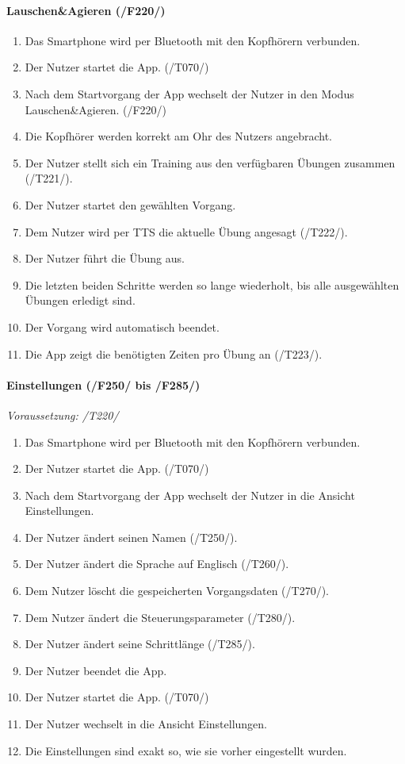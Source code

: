 \documentclass[a4paper,12pt]{article}
\begin{document}
      \paragraph{Lauschen\&Agieren (/F220/)}
      \begin{enumerate}
        \item Das Smartphone wird per Bluetooth mit den Kopfhörern verbunden.
        \item Der Nutzer startet die App. (/T070/)
        \item Nach dem Startvorgang der App wechselt der Nutzer in den Modus \glqq Lauschen\&Agieren\grqq . (/F220/)
        \item Die Kopfhörer werden korrekt am Ohr des Nutzers angebracht.
        \item Der Nutzer stellt sich ein Training aus den verfügbaren Übungen zusammen (/T221/).
        \item Der Nutzer startet den gewählten \Gls{Vorgang}.
        \item Dem Nutzer wird per \Gls{TTS} die aktuelle Übung angesagt (/T222/).
        \item Der Nutzer führt die Übung aus.
        \item Die letzten beiden Schritte werden so lange wiederholt, bis alle ausgewählten Übungen erledigt sind.
        \item Der \Gls{Vorgang} wird automatisch beendet.
        \item Die App zeigt die benötigten Zeiten pro Übung an (/T223/).
      \end{enumerate}

      \paragraph{Einstellungen (/F250/ bis /F285/)}
      \textit{Voraussetzung: /T220/}
      \begin{enumerate}
        \item Das Smartphone wird per Bluetooth mit den Kopfhörern verbunden.
        \item Der Nutzer startet die App. (/T070/)
        \item Nach dem Startvorgang der App wechselt der Nutzer in die Ansicht \glqq Einstellungen\grqq .
        \item Der Nutzer ändert seinen Namen (/T250/).
        \item Der Nutzer ändert die Sprache auf Englisch (/T260/).
        \item Dem Nutzer löscht die gespeicherten \Gls{Vorgangsdaten} (/T270/).
        \item Dem Nutzer ändert die \Gls{Steuerungsparameter} (/T280/).
        \item Der Nutzer ändert seine Schrittlänge (/T285/).
        \item Der Nutzer beendet die App.
        \item Der Nutzer startet die App. (/T070/)
        \item Der Nutzer wechselt in die Ansicht \glqq Einstellungen\grqq .
        \item Die Einstellungen sind exakt so, wie sie vorher eingestellt wurden.
      \end{enumerate}
\end{document}
